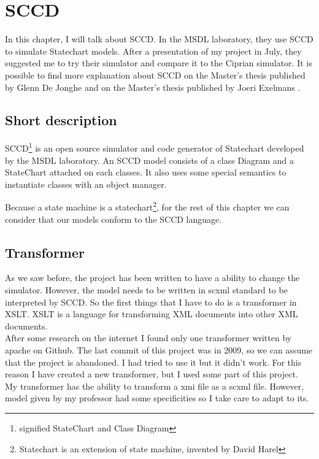 
\chapter{SCCD}
\label{chap:sccd}

In this chapter, I will talk about SCCD. In the MSDL laboratory, they use SCCD to simulate Statechart models. After a presentation of my project in July, they suggested me to try their simulator and compare it to the Ciprian simulator. It is possible to find more explanation about SCCD on the Master's thesis published by Glenn De Jonghe \cite{sccd} and on the Master's thesis published by Joeri Exelmans \cite{sccd2}.

\section{Short description}

SCCD\footnote{signified StateChart and Class Diagram} is an open source simulator and code generator of Statechart developed by the MSDL laboratory. An SCCD model consists of a class Diagram and a StateChart attached on each classes. It also uses some special semantics to instantiate classes with an object manager.

Because a state machine is a statechart\footnote{Statechart is an extension of state machine, invented by David Harel}, for the rest of this chapter we can consider that our models conform to the SCCD language.


\section{Transformer}

As we saw before, the project has been written to have a ability to change the simulator. However, the model needs to be written in scxml standard to be interpreted by SCCD. So the first things that I have to do is a transformer in XSLT. XSLT is a language for transforming XML documents into other XML documents.
~\\

After some research on the internet I found only one transformer written by apache on Github\cite{apache}. The last commit of this project was in 2009, so we can assume that the project is abandoned. I had tried to use it but it didn't work. For this reason I have created a new transformer, but I used some part of this project.
~\\

My transformer has the ability to transform a xmi file as a scxml file. However, model given by my professor had some specificities so I take care to adapt to its.

